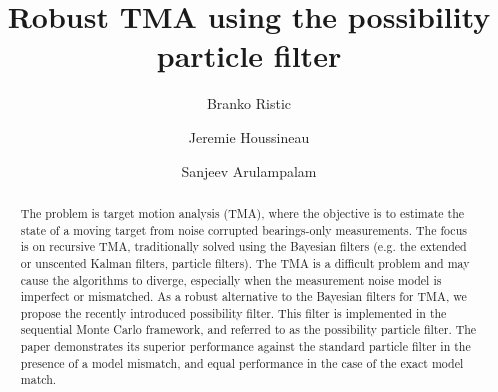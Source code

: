 \documentclass{llncs}
\begin{document}
%
\title{Robust TMA using the possibility particle filter}
%
%
\author{Branko Ristic%
\and
Jeremie Houssineau
\and
Sanjeev Arulampalam
}
%
%
%

\maketitle              %

\begin{abstract}
The problem is target motion analysis (TMA), where the objective is to estimate the state of a moving target from noise corrupted bearings-only measurements. The focus is on recursive TMA, traditionally solved using the Bayesian filters (e.g. the extended or unscented Kalman filters, particle filters). The TMA is a difficult problem and may cause the algorithms to diverge, especially when the measurement noise model is imperfect or mismatched. As a robust alternative to the Bayesian filters for TMA, we propose the recently introduced possibility filter. This filter is implemented in the sequential Monte Carlo framework, and referred to as the possibility particle filter. The paper demonstrates its superior performance against the standard particle filter in the presence of a model mismatch, and equal performance in the case of the exact model match.
\end{abstract}
%
\end{document}
